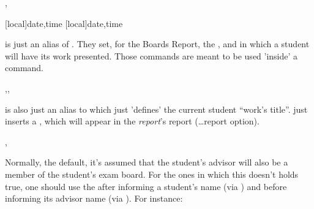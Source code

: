 \documentclass[dctools,english]{ufrgscca} %
\begin{document}
\begin{Macros}{\studenttimeslot,\timeslot}
	\begin{Syntax}%
		\Macro{\studenttimeslot}[local]{date,time}
		\Macro{\timeslot}[local]{date,time}
	\end{Syntax}
\Macro{\timeslot}{} is just an alias of \Macro{\studenttimeslot}{}. They set, for the Boards Report, the ,  and  in which a student will have its work presented. Those commands are meant to be used 'inside' a \Macro{\NewStudent}{} command.
\end{Macros}



\begin{Macros}{\studentTCCtitle,\TCCtitle,\studentremark}
	\begin{Syntax}%
		\Macro{\studentTCCtitle}{title}
		\Macro{\TCCtitle}{title}
		\Macro{\studentremark}{remark}
	\end{Syntax}
\end{Macros}
\Macro{\TCCtitle}{} is also just an alias to \Macro{\studentTCCtitle}{} which just 'defines' the current student “work's title”. \Macro{\studentremark}{} just inserts a , which will appear in the \emph{report}'s report (\ldots report option).


\begin{Macros}{\DistinctBoard,\DefaultBoard}
	\begin{Syntax}%
		\Macro{\DistinctBoard}{}
		\Macro{\DefaultBoard}{}
	\end{Syntax}
Normally, the default, it's assumed that the student's advisor will also be a member of the student's exam board. For the ones in which this doesn't holds true, one should use the \Macro{\DistinctBoard}{} after informing a student's name (via \Macro{\student}{}) and before informing its advisor name (via \Macro{\advisor}{}). For instance:

	\begin{stcode}[st=d.distinct]
\end{stcode}

\end{Macros}
\end{document}
